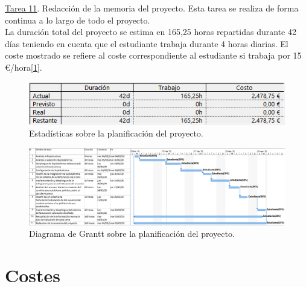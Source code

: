 \underline{Tarea 11}. Redacción de la memoria del proyecto. Esta tarea se realiza de forma continua a lo largo de todo el proyecto.\\

La duración total del proyecto se estima en 165,25 horas repartidas durante 42 días teniendo en cuenta que el estudiante trabaja durante 4 horas diarias. El coste mostrado se refiere al coste correspondiente al estudiante si trabaja por 15 €/hora[\ref{fig:estadisticasproyecto}]. 

\begin{figure}[h!]
  \centering
  \includegraphics[width=1\textwidth]{imaxes/extras/estadisticasProyecto.png}
  \caption{Estadísticas sobre la planificación del proyecto.}
  \label{fig:estadisticasproyecto}
\end{figure}
\begin{figure}[h!]
  \centering
  \includegraphics[width=1\textwidth]{imaxes/extras/diagramaGranttt.png}
  \caption{Diagrama de Grantt sobre la planificación del proyecto.}
  \label{fig:tareasproyecto}
\end{figure}

\section{Costes}
